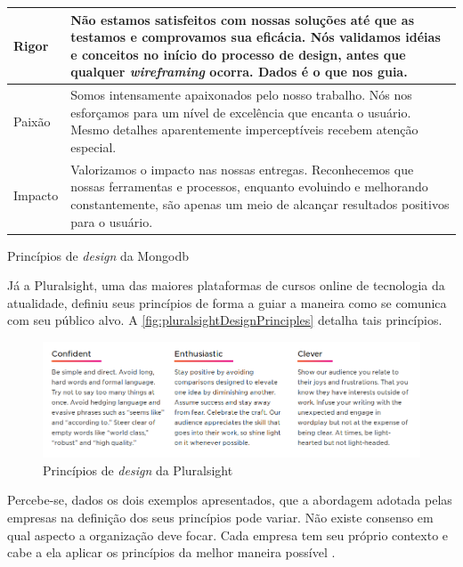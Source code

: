 \begin{quadro}[!htb]
\begin{tabular}{|m{2cm}|m{12cm}|}
		 Rigor & Não estamos satisfeitos com nossas soluções até que as testamos e comprovamos sua eficácia. Nós validamos idéias e conceitos no início do processo de design, antes que qualquer \textit{wireframing} ocorra. Dados é o que nos guia. \\\hline
		 
		 Paixão & Somos intensamente apaixonados pelo nosso trabalho. Nós nos esforçamos para um nível de excelência que encanta o usuário. Mesmo detalhes aparentemente imperceptíveis recebem atenção especial. \\\hline
		 
		 Impacto & Valorizamos o impacto nas nossas entregas. Reconhecemos que nossas ferramentas e processos, enquanto evoluindo e melhorando constantemente, são apenas um meio de alcançar resultados positivos para o usuário. \\\hline
			
	\end{tabular}
	\caption{Princípios de \textit{design} da Mongodb}
	\label{table:mongodbDesignPrinciples}
\end{quadro}

Já a Pluralsight, uma das maiores plataformas de cursos online de tecnologia da atualidade, definiu seus princípios de forma a guiar a maneira como se comunica com seu público alvo. A \autoref{fig:pluralsightDesignPrinciples} detalha tais princípios.

\begin{figure}
	\includegraphics[width=\linewidth]{./04-figuras/02_referencial_teorico/pluralsight-principles.png}
	\caption{Princípios de \textit{design} da Pluralsight}
  \label{fig:pluralsightDesignPrinciples}
\end{figure}

Percebe-se, dados os dois exemplos apresentados, que a abordagem adotada pelas empresas na definição dos seus princípios pode variar. Não existe consenso em qual aspecto a organização deve focar. Cada empresa tem seu próprio contexto e cabe a ela aplicar os princípios da melhor maneira possível \cite{kholmatova2017design}.

